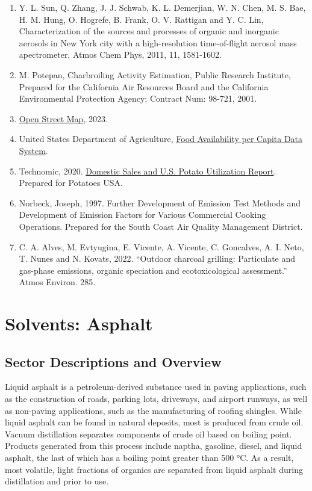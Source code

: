 \documentclass[
  11pt,
  oneside]{book}
\begin{document}
\begin{enumerate}
\item
  Y. L. Sun, Q. Zhang, J. J. Schwab, K. L. Demerjian, W. N. Chen, M. S. Bae, H. M. Hung, O. Hogrefe, B. Frank, O. V. Rattigan and Y. C. Lin, Characterization of the sources and processes of organic and inorganic aerosols in New York city with a high-resolution time-of-flight aerosol mass apectrometer, Atmos Chem Phys, 2011, 11, 1581-1602.
\item
  M. Potepan, Charbroiling Activity Estimation, Public Research Institute, Prepared for the California Air Resources Board and the California Environmental Protection Agency; Contract Num: 98-721, 2001.
\item
  \href{https://www.openstreetmap.org/}{Open Street Map}, 2023.
\item
  United States Department of Agriculture, \href{https://www.ers.usda.gov/data-products/food-availability-per-capita-data-system/}{Food Availability per Capita Data System}.
\item
  Technomic, 2020. \href{https://potatoesusa.com/research-reports/category/market-insights/}{Domestic Sales and U.S. Potato Utilization Report}. Prepared for Potatoes USA.
\item
  Norbeck, Joseph, 1997. Further Development of Emission Test Methods and Development of Emission Factors for Various Commercial Cooking Operations. Prepared for the South Coast Air Quality Management District.
\item
  C. A. Alves, M. Evtyugina, E. Vicente, A. Vicente, C. Goncalves, A. I. Neto, T. Nunes and N. Kovats, 2022. ``Outdoor charcoal grilling: Particulate and gas-phase emissions, organic speciation and ecotoxicological assessment.'' Atmos Environ. 285.
\end{enumerate}

\chapter{Solvents: Asphalt}\label{asphalt}

\section{Sector Descriptions and Overview}\label{sector-descriptions-and-overview-1}

Liquid asphalt is a petroleum-derived substance used in paving applications, such as the construction of roads, parking lots, driveways, and airport runways, as well as non-paving applications, such as the manufacturing of roofing shingles. While liquid asphalt can be found in natural deposits, most is produced from crude oil. Vacuum distillation separates components of crude oil based on boiling point. Products generated from this process include naptha, gasoline, diesel, and liquid asphalt, the last of which has a boiling point greater than 500 °C. As a result, most volatile, light fractions of organics are separated from liquid asphalt during distillation and prior to use.
\end{document}
